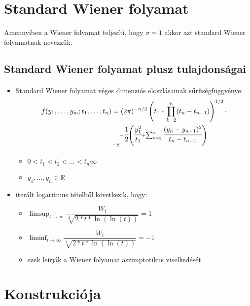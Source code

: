 \documentclass[11pt,a4paper]{article}
\begin{document}
			\section{Standard Wiener folyamat}
				\paragraph{}
					Amennyiben a Wiener folyamat teljesíti, hogy $\sigma = 1$ akkor azt standard Wiener folyamatnak nevezzük.
			\subsection{Standard Wiener folyamat plusz tulajdonságai}
				\paragraph{}
					\begin{itemize}
						\item Standard Wiener folyamat véges dimenziós eloszlásainak sűrűségfüggvénye: 
						$$\begin{aligned}
							f(y_1, \dots, y_m; t_1, \dots , t_n) &= (2\pi)^{-n/2}\left(t_1*\prod_{k=2}^n(t_n-t_{n-1}) \right)^{1/2} \cdot \\
							&\cdot e^{-\cfrac{1}{2} \left( \cfrac{y_1^2}{t_1}+\sum_{k=2}^n \cfrac{(y_n-y_{n-1})^2}{t_n - t_{n-1}} \right)}
						\end{aligned}$$
						\begin{itemize}
							\item $0 < t_1 < t_2 < \dots < t_n \infty$
							\item $y_1, \dots, y_n \in \mathbb{R}$ 
						\end{itemize}
						\item iterált logaritmus tételből következik, hogy:
						\begin{itemize}
							\item $\limsup_{t \to \infty} \dfrac{W_t}{\sqrt[2]{2*t*\ln(\ln(t))}}=1$
							\item $\liminf_{t \to \infty} \dfrac{W_t}{\sqrt[2]{2*t*\ln(\ln(t))}}=-1$
							\item ezek leírják a Wiener folyamat aszimptotikus viselkedését
						\end{itemize}
					\end{itemize}
			\section[Wiener-folyamat konstrukciója]{Konstrukciója}
\end{document}
